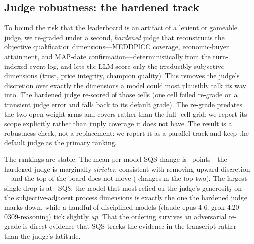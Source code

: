 \subsection{Judge robustness: the hardened track}
\label{sec:hardened}
To bound the risk that the leaderboard is an artifact of a lenient or gameable
judge, we re-graded \resHardenedScope{} under a second, \emph{hardened} judge that
reconstructs the objective qualification dimensions---MEDDPICC coverage,
economic-buyer attainment, and MAP-date confirmation---deterministically from the
turn-indexed event log, and lets the LLM score only the irreducibly subjective
dimensions (trust, price integrity, champion quality). This removes the judge's
discretion over exactly the dimensions a model could most plausibly talk its way
into. The hardened judge re-scored \resHardenedCells{} of those cells (one cell
failed re-grade on a transient judge error and falls back to its default grade).
The re-grade predates the two open-weight arms and covers \resHardenedScope{}
rather than the full \gridCellsTotal{}-cell grid; we report its scope explicitly
rather than imply coverage it does not have. The result is a robustness check,
not a replacement: we report it as a parallel track and keep the default judge as
the primary ranking.

The rankings are stable. The mean per-model SQS change is
\resHardenedMeanDelta{}~points---the hardened judge is marginally \emph{stricter},
consistent with removing upward discretion---and the top of the board does not move
(\resHardenedRankChurn{} changes in the top two). The largest single drop is
\resHardenedMaxDropModel{} at \resHardenedMaxDrop{}~SQS: the model that most relied
on the judge's generosity on the subjective-adjacent process dimensions is exactly
the one the hardened judge marks down, while a handful of disciplined models
(claude-opus-4-6, grok-4.20-0309-reasoning) tick slightly \emph{up}. That the
ordering survives an adversarial re-grade is direct evidence that SQS tracks the
evidence in the transcript rather than the judge's latitude.

